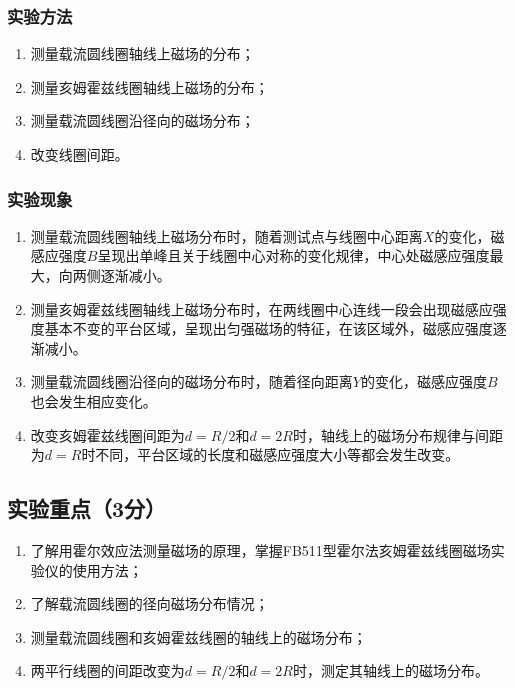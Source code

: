 \documentclass[]{../template/Report}%
\begin{document}
\subsubsection{实验方法}
\begin{enumerate}
    \item 测量载流圆线圈轴线上磁场的分布；
    \item 测量亥姆霍兹线圈轴线上磁场的分布；
    \item 测量载流圆线圈沿径向的磁场分布；
    \item 改变线圈间距。
\end{enumerate}
\subsubsection{实验现象}
\begin{enumerate}
    \item 测量载流圆线圈轴线上磁场分布时，随着测试点与线圈中心距离$X$的变化，磁感应强度$B$呈现出单峰且关于线圈中心对称的变化规律，中心处磁感应强度最大，向两侧逐渐减小。
    \item 测量亥姆霍兹线圈轴线上磁场分布时，在两线圈中心连线一段会出现磁感应强度基本不变的平台区域，呈现出匀强磁场的特征，在该区域外，磁感应强度逐渐减小。
    \item 测量载流圆线圈沿径向的磁场分布时，随着径向距离$Y$的变化，磁感应强度$B$也会发生相应变化。
    \item 改变亥姆霍兹线圈间距为\(d = R/2\)和\(d = 2R\)时，轴线上的磁场分布规律与间距为\(d = R\)时不同，平台区域的长度和磁感应强度大小等都会发生改变。
\end{enumerate}

\subsection{实验重点（3分）}
\begin{enumerate}
    \item 了解用霍尔效应法测量磁场的原理，掌握FB511型霍尔法亥姆霍兹线圈磁场实验仪的使用方法；
    \item 了解载流圆线圈的径向磁场分布情况；
    \item 测量载流圆线圈和亥姆霍兹线圈的轴线上的磁场分布；
    \item 两平行线圈的间距改变为\(d = R / 2\)和\(d = 2R\)时，测定其轴线上的磁场分布。
\end{enumerate}
\end{document}
